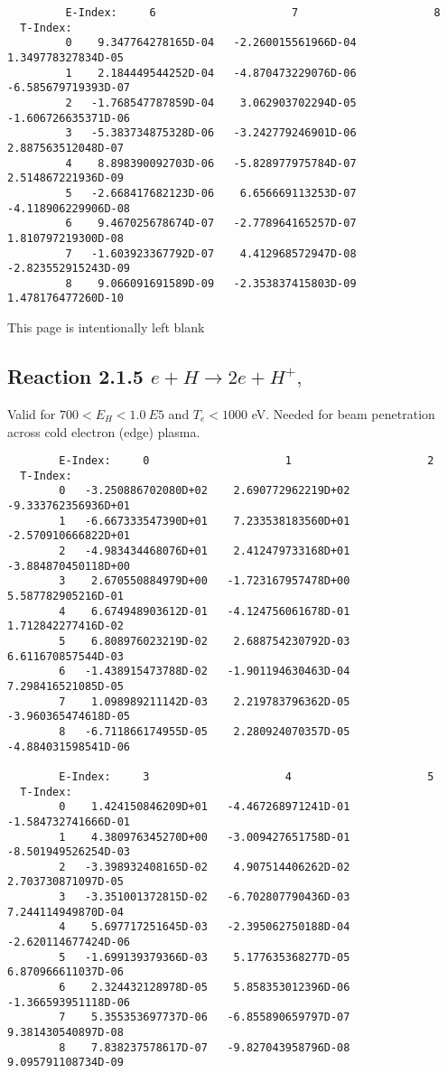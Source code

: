 \documentclass[12pt,dvipdfmx]{article}
\begin{document}
{\begin{small}
\begin{verbatim}
         E-Index:     6                     7                     8
  T-Index:
         0    9.347764278165D-04   -2.260015561966D-04    1.349778327834D-05
         1    2.184449544252D-04   -4.870473229076D-06   -6.585679719393D-07
         2   -1.768547787859D-04    3.062903702294D-05   -1.606726635371D-06
         3   -5.383734875328D-06   -3.242779246901D-06    2.887563512048D-07
         4    8.898390092703D-06   -5.828977975784D-07    2.514867221936D-09
         5   -2.668417682123D-06    6.656669113253D-07   -4.118906229906D-08
         6    9.467025678674D-07   -2.778964165257D-07    1.810797219300D-08
         7   -1.603923367792D-07    4.412968572947D-08   -2.823552915243D-09
         8    9.066091691589D-09   -2.353837415803D-09    1.478176477260D-10
\end{verbatim}\end{small}

\newpage
This page is intentionally left blank
\newpage
\subsection{
Reaction 2.1.5  $e + H \rightarrow 2e + H^+ ,\ $ }

Valid for $ 700 < E_H < 1.0~ E5$ and $T_e  < 1000$ eV.
Needed for beam penetration across cold electron (edge) plasma.

\begin{small}\begin{verbatim}
        E-Index:     0                     1                     2
  T-Index:
        0   -3.250886702080D+02    2.690772962219D+02   -9.333762356936D+01
        1   -6.667333547390D+01    7.233538183560D+01   -2.570910666822D+01
        2   -4.983434468076D+01    2.412479733168D+01   -3.884870450118D+00
        3    2.670550884979D+00   -1.723167957478D+00    5.587782905216D-01
        4    6.674948903612D-01   -4.124756061678D-01    1.712842277416D-02
        5    6.808976023219D-02    2.688754230792D-03    6.611670857544D-03
        6   -1.438915473788D-02   -1.901194630463D-04    7.298416521085D-05
        7    1.098989211142D-03    2.219783796362D-05   -3.960365474618D-05
        8   -6.711866174955D-05    2.280924070357D-05   -4.884031598541D-06

        E-Index:     3                     4                     5
  T-Index:
        0    1.424150846209D+01   -4.467268971241D-01   -1.584732741666D-01
        1    4.380976345270D+00   -3.009427651758D-01   -8.501949526254D-03
        2   -3.398932408165D-02    4.907514406262D-02    2.703730871097D-05
        3   -3.351001372815D-02   -6.702807790436D-03    7.244114949870D-04
        4    5.697717251645D-03   -2.395062750188D-04   -2.620114677424D-06
        5   -1.699139379366D-03    5.177635368277D-05    6.870966611037D-06
        6    2.324432128978D-05    5.858353012396D-06   -1.366593951118D-06
        7    5.355353697737D-06   -6.855890659797D-07    9.381430540897D-08
        8    7.838237578617D-07   -9.827043958796D-08    9.095791108734D-09


\end{verbatim}
\end{small}}
\end{document}
